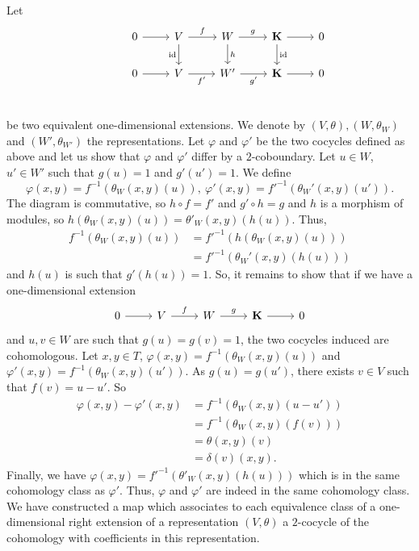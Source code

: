 \documentclass[11pt, twoside]{article}
\begin{document}
Let  \[\begin{tikzcd}
	& 0 & V & W & {\mathbf{K}} & 0 \\
	& 0 & V & {W'} & {\mathbf{K}} & 0 \\
	{}
	\arrow[from=1-2, to=1-3]
	\arrow["f", from=1-3, to=1-4]
	\arrow["{\mathrm{id}}"', from=1-3, to=2-3]
	\arrow["g", from=1-4, to=1-5]
	\arrow["h", from=1-4, to=2-4]
	\arrow[from=1-5, to=1-6]
	\arrow["{\mathrm{id}}", from=1-5, to=2-5]
	\arrow[from=2-2, to=2-3]
	\arrow["{f'}"', from=2-3, to=2-4]
	\arrow["{g'}"', from=2-4, to=2-5]
	\arrow[from=2-5, to=2-6]
\end{tikzcd}\] be two equivalent one-dimensional extensions. We denote by $(V,\theta),(W,\theta_W)$ and $(W',\theta_{W'}) $ the representations. Let $\varphi $ and $\varphi'$ be the two cocycles defined as above and let us show that $\varphi $ and $\varphi'$ differ by a $2$-coboundary. Let $u\in W$, $u'\in W'$ such that $g(u)=1$ and $g'(u')=1$. We define $$\varphi(x,y)= f^{-1}(\theta_W(x,y)(u)), \ \varphi'(x,y)=f'^{-1}(\theta_W'(x,y)(u')). $$ The diagram is commutative, so $h\circ f=f' $ and $g'\circ h=g $ and $h$ is a morphism of modules, so $h(\theta_W(x,y)(u))=\theta'_W(x,y)(h(u))$. Thus, \begin{align*}
    f^{-1}(\theta_W(x,y)(u)) &= f'^{-1}(h(\theta_W(x,y)(u)))\\ & = f'^{-1}(\theta_W'(x,y)(h(u)))
\end{align*} and $h(u)$ is such that $g'(h(u))=1$. So, it remains to show that if we have a one-dimensional extension \[\begin{tikzcd}
	0 & V & W & {\mathbf{K}} & 0
	\arrow[from=1-1, to=1-2]
	\arrow["f", from=1-2, to=1-3]
	\arrow["g", from=1-3, to=1-4]
	\arrow[from=1-4, to=1-5]
\end{tikzcd}\] and $u,v\in W$ are such that $g(u)=g(v)=1$, the two cocycles induced are cohomologous. Let $x,y\in T$, $\varphi(x,y)=f^{-1}(\theta_W(x,y)(u)) $ and $\varphi'(x,y)=f^{-1}(\theta_W(x,y)(u')) $. As $g(u)=g(u') $, there exists $v\in V$ such that $f(v)=u-u'$. So \begin{align*}
    \varphi(x,y) -\varphi'(x,y) &= f^{-1}(\theta_W(x,y)(u-u'))\\&= f^{-1}(\theta_W(x,y)(f(v)))\\&= \theta(x,y)(v)\\ & =\delta(v)(x,y).
\end{align*} Finally, we have  $\varphi(x,y)= f'^{-1}(\theta'_W(x,y)(h(u))) $ which is in the same cohomology class as $\varphi' $.  Thus, $\varphi $ and $\varphi'$ are indeed in the same cohomology class. We have constructed a map which associates to each equivalence class of a one-dimensional right extension of a representation $(V,\theta)$  a $2$-cocycle of the cohomology with coefficients in this representation. 
\end{document}
